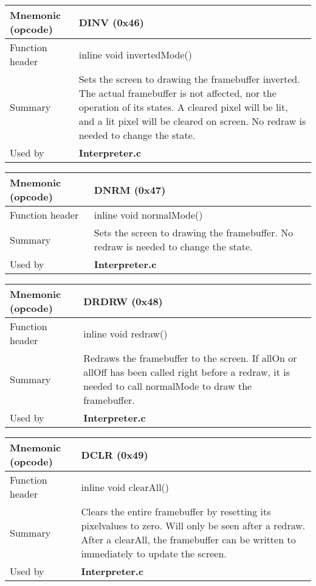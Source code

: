 \begin{table}[H]
\begin {tabularx} {\textwidth} {l|X} Mnemonic (opcode) &  DINV  (0x46)\bigskip\\
\hline
\hline
Function header & inline void invertedMode()\bigskip\\
Summary &  Sets the screen to drawing the framebuffer inverted. The actual framebuffer is not affected, nor the operation of its states. A cleared pixel will be lit, and a lit pixel will be cleared on screen. No redraw is needed to change the state. \bigskip\\
Used by &
\textbf{Interpreter.c}\bigskip \\
\hline
\end{tabularx}
\end{table}
\begin{table}[H]
\begin {tabularx} {\textwidth} {l|X} Mnemonic (opcode) &  DNRM  (0x47)\bigskip\\
\hline
\hline
Function header & inline void normalMode()\bigskip\\
Summary &  Sets the screen to drawing the framebuffer. No redraw is needed to change the state. \bigskip\\
Used by &
\textbf{Interpreter.c}\bigskip \\
\hline
\end{tabularx}
\end{table}
\begin{table}[H]
\begin {tabularx} {\textwidth} {l|X} Mnemonic (opcode) &  DRDRW  (0x48)\bigskip\\
\hline
\hline
Function header & inline void redraw()\bigskip\\
Summary &  Redraws the framebuffer to the screen. If allOn or allOff has been called right before a redraw, it is needed to call normalMode to draw the framebuffer. \bigskip\\
Used by &
\textbf{Interpreter.c}\bigskip \\
\hline
\end{tabularx}
\end{table}
\begin{table}[H]
\begin {tabularx} {\textwidth} {l|X} Mnemonic (opcode) &  DCLR  (0x49)\bigskip\\
\hline
\hline
Function header & inline void clearAll()\bigskip\\
Summary &  Clears the entire framebuffer by resetting its pixelvalues to zero. Will only be seen after a redraw. After a clearAll, the framebuffer can be written to immediately to update the screen. \bigskip\\
Used by &
\textbf{Interpreter.c}\bigskip \\
\hline
\end{tabularx}
\end{table}

